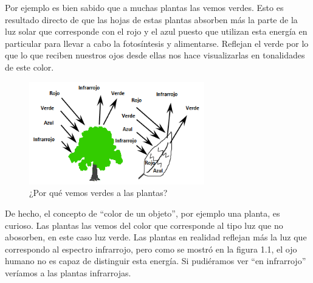 \documentclass[11pt,spanish]{article}
\begin{document}
Por ejemplo es bien sabido que a muchas plantas las vemos verdes. Esto es resultado directo de que las hojas de estas plantas absorben más la parte de la luz solar que corresponde con el rojo y el azul puesto que utilizan esta energía en particular para llevar a cabo la fotosíntesis y alimentarse. Reflejan el verde por lo que lo que reciben nuestros ojos desde ellas nos hace visualizarlas en tonalidades de este color.


\begin{figure}[h!]
\centering
\includegraphics[width=3in]{4_plantas.png}
\caption{¿Por qué vemos verdes a las plantas?}
\end{figure}


\newpage

De hecho, el concepto de "`color de un objeto"', por ejemplo una planta, es curioso.  Las plantas las vemos del color que corresponde al tipo luz que no abosorben, en este caso luz verde. Las plantas en realidad reflejan más la luz que correspondo al espectro infrarrojo, pero como se mostró en la figura 1.1, el ojo humano no es capaz de distinguir esta energía. Si pudiéramos ver "`en infrarrojo"' veríamos a las plantas infrarrojas. 
\end{document}
